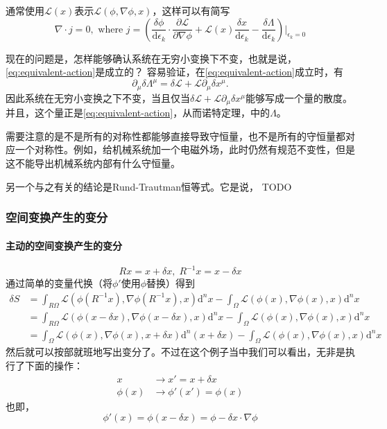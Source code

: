 \documentclass[UTF8, a4paper]{ctexart}
\begin{document}
通常使用$\mathcal{L}(x)$表示$\mathcal{L}(\phi, \nabla \phi, x)$，这样可以有简写
\begin{equation}
    \nabla \cdot j = 0, \text{ where } j = \left(\frac{\delta \phi}{\mathrm{d}\epsilon_k} \cdot \frac{\partial \mathcal{L}}{\partial \nabla \phi} + \mathcal{L}(x) \frac{\delta x}{\mathrm{d} \epsilon_k} - \frac{\delta \Lambda}{\mathrm{d}\epsilon_k}\right) \bigg |_{\epsilon_k=0}
    \label{eq:nother-current}
\end{equation}

现在的问题是，怎样能够确认系统在无穷小变换下不变，也就是说，\eqref{eq:equivalent-action}是成立的？
容易验证，在\eqref{eq:equivalent-action}成立时，有
\begin{equation}
    \partial_\mu \delta \Lambda^\mu = \delta \mathcal{L} + \mathcal{L} \partial_\mu \delta x^\mu.
\end{equation}
因此系统在无穷小变换之下不变，当且仅当$\delta \mathcal{L} + \mathcal{L} \partial_\mu \delta x^\mu$能够写成一个量的散度。
并且，这个量正是\eqref{eq:equivalent-action}，从而诺特定理，中的$\Lambda$。

需要注意的是不是所有的对称性都能够直接导致守恒量，也不是所有的守恒量都对应一个对称性。例如，给机械系统加一个电磁外场，此时仍然有规范不变性，但是这不能导出机械系统内部有什么守恒量。

另一个与之有关的结论是Rund-Trautman恒等式。它是说，
TODO

\subsubsection{空间变换产生的变分}

\paragraph{主动的空间变换产生的变分}
\[
    Rx = x + \delta x, \; R^{-1}x = x - \delta x
\]
通过简单的变量代换（将$\phi'$使用$\phi$替换）得到
\[
    \begin{aligned}
        \delta S &= \int_{R\Omega} \mathcal{L}(\phi(R^{-1}x), \nabla \phi (R^{-1}x), x) \mathrm{d}^n x - \int_\Omega \mathcal{L}(\phi(x), \nabla \phi (x), x) \mathrm{d}^n x \\
        &= \int_{R\Omega} \mathcal{L}(\phi(x - \delta x), \nabla \phi (x - \delta x), x ) \mathrm{d}^n x - \int_\Omega \mathcal{L}(\phi(x), \nabla \phi (x), x) \mathrm{d}^n x \\
        &= \int_\Omega \mathcal{L}(\phi(x), \nabla \phi (x), x + \delta x) \mathrm{d}^n (x + \delta x) - \int_\Omega \mathcal{L}(\phi(x), \nabla \phi (x), x) \mathrm{d}^n x
    \end{aligned}    
\]
然后就可以按部就班地写出变分了。不过在这个例子当中我们可以看出，无非是执行了下面的操作：
$$
\begin{aligned}
    x &\rightarrow x' = x + \delta x \\
    \phi(x) &\rightarrow \phi'(x') = \phi (x)
\end{aligned}
$$
也即，
$$
\phi'(x) = \phi (x - \delta x) = \phi - \delta x \cdot \nabla \phi
$$
\end{document}
